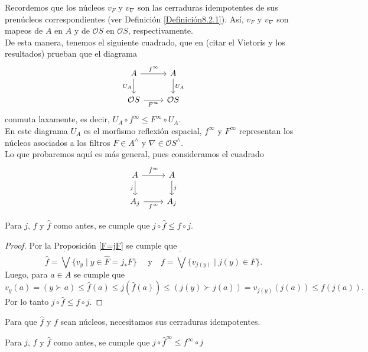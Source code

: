 Recordemos que los núcleos $v_F$ y $v_\nabla$ son las cerraduras idempotentes de sus prenúcleos correspondientes (ver Definición \ref{Definición8.2.1}). Así, $v_F$ y $v_\nabla$ son mapeos de $A$ en $A$ y de $\mathcal{O}S$ en $\mathcal{O}S$, respectivamente.\\

De esta manera, tenemos el siguiente cuadrado, que en (citar el Vietoris y los resultados) prueban que el diagrama
\[\begin{tikzcd}
	A & A \\
	{\mathcal{O}S} & {\mathcal{O}S}
	\arrow["{f^\infty}", from=1-1, to=1-2]
	\arrow["{U_A}"', from=1-1, to=2-1]
	\arrow["{U_A}", from=1-2, to=2-2]
	\arrow["{F^\infty}"', from=2-1, to=2-2]
\end{tikzcd}\]
conmuta laxamente, es decir, $U_A\circ f^\infty\leq F^\infty \circ U_A$.\\

En este diagrama $U_A$ es el morfismo reflexión espacial, $f^\infty$ y $F^\infty$ representan los núcleos asociados a los filtros $F\in A^\wedge$ y $\nabla\in \mathcal{O}S^\wedge$.\\

Lo que probaremos aquí es más general, pues consideramos el cuadrado 
\[\begin{tikzcd}
	A & A \\
	{A_j} & {A_j}
	\arrow["{\hat{f}^\infty}", from=1-1, to=1-2]
	\arrow["j"', from=1-1, to=2-1]
	\arrow["j", from=1-2, to=2-2]
	\arrow["{f^\infty}"', from=2-1, to=2-2]
\end{tikzcd}\]

\begin{lem}
    Para $j$, $f$ y $\hat{f}$ como antes, se cumple que $j\circ \hat{f}\leq f\circ j$.
\end{lem}

\begin{proof}\label{f1f}
    Por la Proposición \ref{F=jF} se cumple que
    \[
    \hat{f}=\dot{\bigvee}\{v_y\mid y\in \hat{F}=j_*F\}\quad  \mbox{ y} \quad f=\dot{\bigvee}\{v_{j(y)}\mid j(y)\in F\}. 
    \]
Luego, para $a\in A$ se cumple que
\[
v_y(a)=(y\succ a)\leq \hat{f}(a)\leq j(\hat{f}(a))\leq (j(y)\succ j(a))=v_{j(y)}(j(a))\leq f(j(a)).
\]
Por lo tanto $j\circ \hat{f}\leq f\circ j$.
\end{proof}

Para que $\hat{f}$ y $f$ sean núcleos, necesitamos sus cerraduras idempotentes.

\begin{cor}\label{finftyf}
    Para $j$, $f$ y $\hat{f}$ como antes, se cumple que $j\circ \hat{f}^\infty\leq f^\infty\circ j$
\end{cor}

